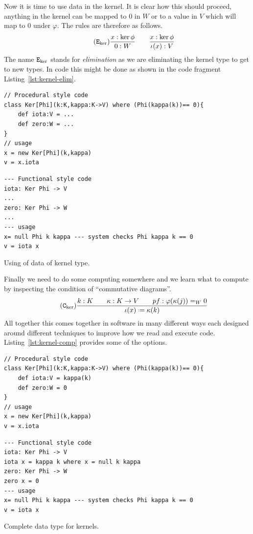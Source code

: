 \documentclass[12pt,twoside,dvipsnames,letterpaper]{memoir}
\begin{document}
Now it is time to use data in the kernel.  It is clear how this should 
proceed, anything in the kernel can be mapped to $0$ in $W$ or to a 
value in $V$ which will map to $0$ under $\varphi$.  The rules are therefore 
as follows.    
\begin{gather}
    \tag{$\elim{\ker}$}
    \frac{
        x:\ker\phi
    }{
        0:W
    }\qquad
    \frac{
        x:\ker\phi
    }{
        \iota(x):V
    }
\end{gather}
The name $\mathtt{E}_{\ker}$ stands for \emph{elimination} as we are eliminating 
the kernel type to get to new types.
In code this might be done as shown in the code fragment Listing~\ref{lst:kernel-elim}.
\begin{lstfloat}[!htbp]
\begin{lstlisting}[language=Sava]
// Procedural style code
class Ker[Phi](k:K,kappa:K->V) where (Phi(kappa(k))== 0){
    def iota:V = ...
    def zero:W = ...
}
// usage 
x = new Ker[Phi](k,kappa)
v = x.iota
\end{lstlisting}
\begin{lstlisting}[language=Hidris]
--- Functional style code
iota: Ker Phi -> V
...
zero: Ker Phi -> W
...
--- usage 
x= null Phi k kappa --- system checks Phi kappa k == 0
v = iota x
\end{lstlisting}    
\caption{Using of data of kernel type.}
\label{lst:kernel-elim}
\end{lstfloat}

Finally we need to do some computing somewhere and we learn 
what to compute by inspecting the condition of ``commutative diagrams''.
\begin{gather}
    \tag{$\comp{\ker}$}
    \frac{
        k:K\qquad \kappa:K\to V\qquad pf:\varphi(\kappa(j))=_W 0
    }{
        \iota(x) \defeq \kappa(k)
    }
\end{gather}
All together this comes together in software in many different ways 
each designed around different techniques to improve how we read and 
execute code.  Listing~\ref{lst:kernel-comp} provides some of the options.
\begin{lstfloat}[!htbp]
\begin{lstlisting}[language=Sava]
// Procedural style code
class Ker[Phi](k:K,kappa:K->V) where (Phi(kappa(k))== 0){
    def iota:V = kappa(k)
    def zero:W = 0
}
// usage 
x = new Ker[Phi](k,kappa)
v = x.iota
\end{lstlisting}
\begin{lstlisting}[language=Hidris]
--- Functional style code
iota: Ker Phi -> V
iota x = kappa k where x = null k kappa
zero: Ker Phi -> W
zero x = 0
--- usage 
x= null Phi k kappa --- system checks Phi kappa k == 0
v = iota x
\end{lstlisting}    
\caption{Complete data type for kernels.}
\label{lst:kernel-comp}
\end{lstfloat}

\end{document}
